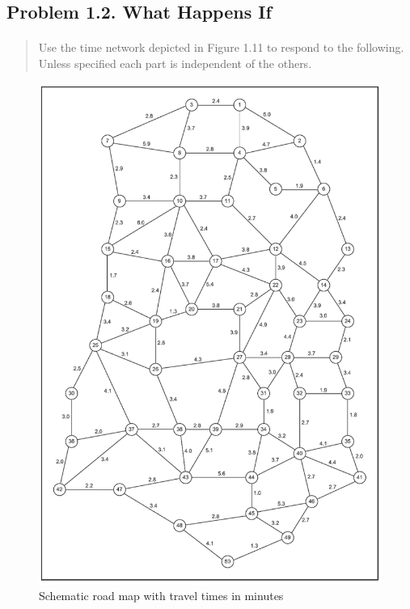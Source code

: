 \subsection{Problem 1.2. What Happens If}

\paragraph{}
\begin{quote}
Use the time network depicted in Figure 1.11 to respond to the following. Unless specified each part is independent of the others.
\end{quote}

\begin{figure}[H]
\centering
\includegraphics[scale=1]{./img/figure1-11.png}
\caption{Schematic road map with travel times in minutes}
\label{figure1-11}
\end{figure}

